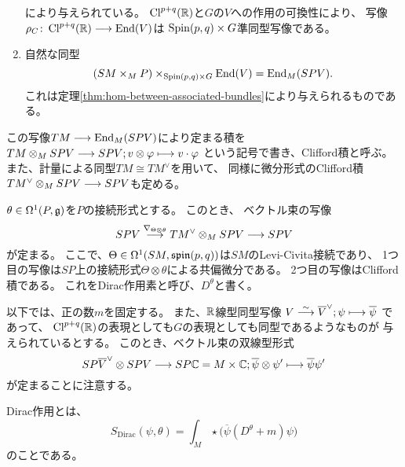 \begin{dfn}
\begin{enumerate}
\begin{equation}
    \end{equation}
    により与えられている。
    $\operatorname{Cl}^{p+q}(\mathbb{R})$と$G$の$V$への作用の可換性により、
    写像$\rho_C\colon\operatorname{Cl}^{p+q}(\mathbb{R})\longrightarrow\operatorname{End}(V)$は
    $\operatorname{Spin}(p,q)\times G$準同型写像である。
    \item
    自然な同型
    \begin{equation}
      (SM \times_M P) \times_{\operatorname{Spin}(p,q)\times G} \operatorname{End}(V) =
      \operatorname{End}_M(SPV).
    \end{equation}
    これは定理\ref{thm:hom-between-associated-bundles}により与えられるものである。
  \end{enumerate}
  この写像$TM\longrightarrow\operatorname{End}_M(SPV)$により定まる積を
  $TM\otimes_M SPV\longrightarrow SPV; v\otimes\varphi\longmapsto v\cdot \varphi$
  という記号で書き、Clifford積と呼ぶ。
  また、計量による同型$TM\cong TM^{\vee}$を用いて、
  同様に微分形式のClifford積$TM^{\vee}\otimes_M SPV\longrightarrow SPV$も定める。
\end{dfn}

\begin{dfn}
  $\theta\in\Omega^1(P,\mathfrak{g})$を$P$の接続形式とする。
  このとき、
  ベクトル束の写像
  \begin{equation}
    SPV
    \stackrel{\nabla_{\Theta\otimes\theta}}{\longrightarrow}
    TM^{\vee}\otimes_M SPV
    \longrightarrow
    SPV
  \end{equation}
  が定まる。
  ここで、$\Theta\in\Omega^1(SM,\operatorname{\mathfrak{s}\mathfrak{p}\mathfrak{i}\mathfrak{n}}(p,q))$は$SM$のLevi-Civita接続であり、
  1つ目の写像は$SP$上の接続形式$\Theta\otimes\theta$による共偏微分である。
  2つ目の写像はClifford積である。
  これをDirac作用素と呼び、$D^\theta$と書く。
\end{dfn}


以下では、正の数$m$を固定する。
また、$\mathbb{R}$線型同型写像
$V\stackrel{\sim}{\longrightarrow}\overline{V}^\vee; \psi \longmapsto \overline{\psi}$
であって、
$\operatorname{Cl}^{p+q}(\mathbb{R})$の表現としても$G$の表現としても同型であるようなものが
与えられているとする。
このとき、ベクトル束の双線型形式
\begin{equation}
  SP\overline{V}^\vee \otimes SPV \longrightarrow SP\mathbb{C} = M \times \mathbb{C};
  \overline{\psi}\otimes\psi'\longmapsto\overline{\psi}\psi'
\end{equation}
が定まることに注意する。

\begin{dfn}
  Dirac作用とは、
  \begin{equation}
    S_{\mathrm{Dirac}}(\psi,\theta)=\int_M
    \star \bigl(\overline{\psi}(D^\theta + m)\psi \bigr)
  \end{equation}
  のことである。
\end{dfn}

